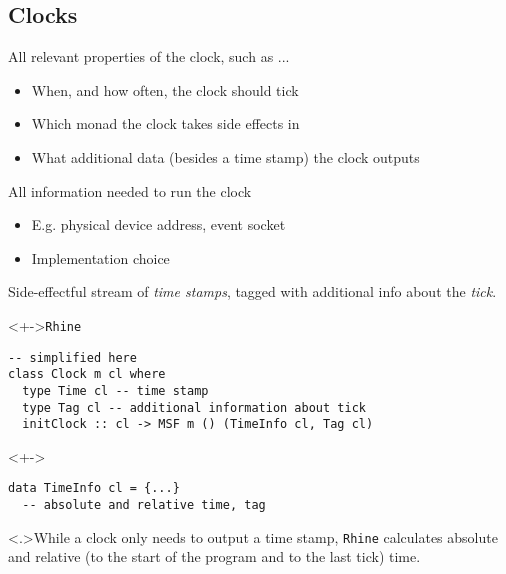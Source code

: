 \documentclass{enigtex-beamer-base}
\begin{document}
\subsection{Clocks}

\begin{frame}[fragile]
	\begin{description}[<+->]
		\item[Clock type] All relevant properties of the clock, such as ...
		\begin{itemize}[<+->]
			\item When, and how often, the clock should tick
			\item Which monad the clock takes side effects in
			\item What additional data (besides a time stamp) the clock outputs
		\end{itemize}
		\item[Clock value] All information needed to run the clock
		\begin{itemize}[<+->]
			\item E.g. physical device address, event socket
			\item Implementation choice
		\end{itemize}
		\item[Running clock] Side-effectful stream of \emph{time stamps}, tagged with additional info about the \emph{tick}.
	\end{description}
\end{frame}


\begin{frame}[fragile]
\begin{block}<+->{\texttt{Rhine}}
\begin{verbatim}
-- simplified here
class Clock m cl where
  type Time cl -- time stamp
  type Tag cl -- additional information about tick
  initClock :: cl -> MSF m () (TimeInfo cl, Tag cl)
\end{verbatim}
\end{block}

\begin{block}<+->{}
\begin{verbatim}
data TimeInfo cl = {...}
  -- absolute and relative time, tag
\end{verbatim}
\end{block}
\note<.>{While a clock only needs to output a time stamp,
\texttt{Rhine} calculates absolute and relative (to the start of the program and to the last tick) time.}
\end{frame}
\end{document}

